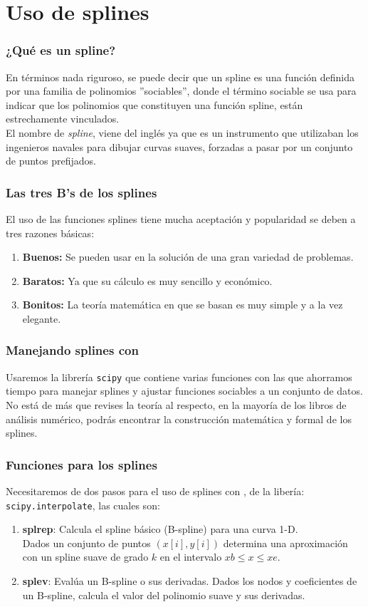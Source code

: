 \section{Uso de splines}
\begin{frame}
\frametitle{¿Qué es un spline?}
En términos nada riguroso, se puede decir que un spline es una función definida por una familia de polinomios ''sociables'', donde el término sociable se usa para indicar que los polinomios que constituyen una función spline, están estrechamente vinculados.
\\
\medskip
El nombre de \emph{spline}, viene del inglés ya que es un instrumento que utilizaban los ingenieros navales para dibujar curvas suaves, forzadas a pasar por un conjunto de puntos prefijados.
\end{frame}
\begin{frame}
\frametitle{Las tres B's de los splines}
El uso de las funciones splines tiene mucha aceptación y popularidad se deben a tres razones básicas:
\begin{enumerate}[<+->]
\item \textbf{Buenos:} Se  pueden usar en la solución de una gran variedad de problemas.
\item \textbf{Baratos:} Ya que su cálculo es muy sencillo y económico.
\item \textbf{Bonitos:} La teoría matemática en que se basan es muy simple y a la vez elegante.
\end{enumerate}
\end{frame}
\begin{frame}
\frametitle{Manejando splines con \python}
Usaremos la librería \texttt{scipy} que contiene varias funciones con las que ahorramos tiempo para manejar splines y ajustar funciones sociables a un conjunto de datos.
\\
\medskip
No está de más que revises la teoría al respecto, en la mayoría de los libros de análisis numérico, podrás encontrar la construcción matemática y formal de los splines.
\end{frame}
\begin{frame}
\frametitle{Funciones para los splines}
Necesitaremos de dos pasos para el uso de splines con \python, de la libería: \texttt{scipy.interpolate}, las cuales son:
\begin{enumerate}
\item \textbf{splrep}: Calcula el spline básico (B-spline) para una curva 1-D.
\\
\medskip
Dados un conjunto de puntos $(x[i],y[i])$ determina una aproximación con un spline suave de grado $k$ en el intervalo $xb \leq x \leq xe$.
\item \textbf{splev}: Evalúa un B-spline o sus derivadas. Dados los nodos y coeficientes de un B-spline, calcula el valor del polinomio suave y sus derivadas.
\end{enumerate}
\end{frame}
